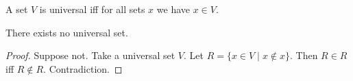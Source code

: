 \begin{definition}\label{universal_set}
    A set $V$ is universal iff
    for all sets $x$ we have $x\in V$.
\end{definition}

\begin{theorem}\label{no_universal_set}
    There exists no universal set.
\end{theorem}
\begin{proof}
    Suppose not.
    Take a universal set $V$.
    Let $R = \{ x\in V \mid x\not\in x \}$.
    Then $R\in R$ iff $R\not\in R$.
    Contradiction.
\end{proof}
